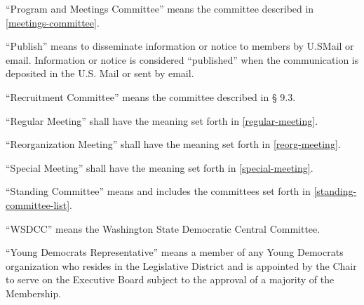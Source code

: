 \begin{alphalist}
    \item “Program and Meetings Committee” means the committee described in \autoref{meetings-committee}.
    \item “Publish” means to disseminate information or notice to members by U.SMail or email.  Information or notice is considered “published” when the communication is deposited in the U.S. Mail or sent by email.
    \item “Recruitment Committee” means the committee described in § 9.3.
    \item “Regular Meeting” shall have the meaning set forth in \autoref{regular-meeting}.
    \item “Reorganization Meeting” shall have the meaning set forth in \autoref{reorg-meeting}.
    \item “Special Meeting” shall have the meaning set forth in \autoref{special-meeting}.
    \item “Standing Committee” means and includes the committees set forth in \autoref{standing-committee-list}.
    \item “WSDCC” means the Washington State Democratic Central Committee.
    \item “Young Democrats Representative” means a member of any Young Democrats organization who resides in the \fortythird{} Legislative District and is appointed by the Chair to serve on the Executive Board subject to the approval of a majority of the Membership.
\end{alphalist}

